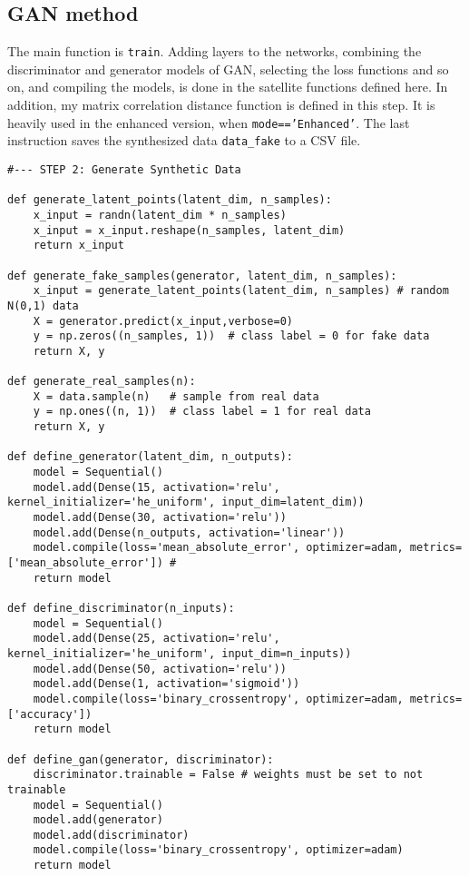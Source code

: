 \documentclass[oneside,10pt]{book}
\begin{document}
\subsection{GAN method}\label{xcxxsdzs}\label{maindqq}

The main function is \texttt{train}. Adding layers to the networks, combining the discriminator and generator models of GAN, selecting 
 the loss functions and so on, and compiling the models, is done in the satellite functions defined here.
In addition, my matrix correlation distance function is defined in this step. It is heavily used in the enhanced version, when
 \texttt{mode=='Enhanced'}. The last instruction saves the synthesized data \texttt{data\_fake} to a CSV file.\vspace{1ex}


\begin{lstlisting}
#--- STEP 2: Generate Synthetic Data

def generate_latent_points(latent_dim, n_samples):
    x_input = randn(latent_dim * n_samples) 
    x_input = x_input.reshape(n_samples, latent_dim)
    return x_input

def generate_fake_samples(generator, latent_dim, n_samples):
    x_input = generate_latent_points(latent_dim, n_samples) # random N(0,1) data
    X = generator.predict(x_input,verbose=0) 
    y = np.zeros((n_samples, 1))  # class label = 0 for fake data
    return X, y

def generate_real_samples(n):
    X = data.sample(n)   # sample from real data
    y = np.ones((n, 1))  # class label = 1 for real data
    return X, y

def define_generator(latent_dim, n_outputs): 
    model = Sequential()
    model.add(Dense(15, activation='relu',  kernel_initializer='he_uniform', input_dim=latent_dim))
    model.add(Dense(30, activation='relu'))
    model.add(Dense(n_outputs, activation='linear'))
    model.compile(loss='mean_absolute_error', optimizer=adam, metrics=['mean_absolute_error']) # 
    return model

def define_discriminator(n_inputs):
    model = Sequential()
    model.add(Dense(25, activation='relu', kernel_initializer='he_uniform', input_dim=n_inputs))
    model.add(Dense(50, activation='relu'))
    model.add(Dense(1, activation='sigmoid'))
    model.compile(loss='binary_crossentropy', optimizer=adam, metrics=['accuracy']) 
    return model

def define_gan(generator, discriminator):
    discriminator.trainable = False # weights must be set to not trainable
    model = Sequential()
    model.add(generator) 
    model.add(discriminator) 
    model.compile(loss='binary_crossentropy', optimizer=adam)  
    return model


\end{lstlisting}
\end{document}
